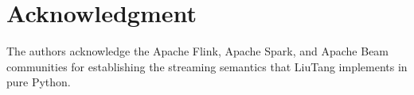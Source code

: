 \documentclass[conference]{IEEEtran}
\begin{document}
\section*{Acknowledgment}

The authors acknowledge the Apache Flink, Apache Spark, and Apache Beam communities for establishing the streaming semantics that LiuTang implements in pure Python.



\end{document}
